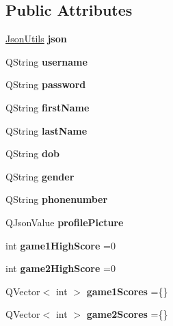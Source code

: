 \subsection*{Public Attributes}
\begin{DoxyCompactItemize}
\item 
\mbox{\label{classUser_af691f29bfbfaecdb752ccdf762f5d037}} 
\hyperlink{classJsonUtils}{Json\+Utils} {\bfseries json}
\item 
\mbox{\label{classUser_ae4202de2b7974e92a55b913d20b03833}} 
Q\+String {\bfseries username}
\item 
\mbox{\label{classUser_ac887622f22a898c097d156ad964be846}} 
Q\+String {\bfseries password}
\item 
\mbox{\label{classUser_aed78465b35175ff33ab3ca3ca1ebe450}} 
Q\+String {\bfseries first\+Name}
\item 
\mbox{\label{classUser_a3a225093bbb405dab285e74e24cef7c5}} 
Q\+String {\bfseries last\+Name}
\item 
\mbox{\label{classUser_a7674a8234cb3ac9ad27866181c34f3a3}} 
Q\+String {\bfseries dob}
\item 
\mbox{\label{classUser_ae7cf3e04e6aba46f20af4c6802630074}} 
Q\+String {\bfseries gender}
\item 
\mbox{\label{classUser_a015d9cec85964df084486386bc6bd9d4}} 
Q\+String {\bfseries phonenumber}
\item 
\mbox{\label{classUser_a5723ab5a77c21e173453505b9af4597f}} 
Q\+Json\+Value {\bfseries profile\+Picture}
\item 
\mbox{\label{classUser_a7f4dadaaea03ff00240d7bd3d2e8a8fd}} 
int {\bfseries game1\+High\+Score} =0
\item 
\mbox{\label{classUser_a4ad78a4dd8e01f69618b510cf5d32cea}} 
int {\bfseries game2\+High\+Score} =0
\item 
\mbox{\label{classUser_a521511071f8d3d804f089a0c6788780a}} 
Q\+Vector$<$ int $>$ {\bfseries game1\+Scores} =\{\}
\item 
\mbox{\label{classUser_a23644b80da955e4ca44a0f74b0b4b11e}} 
Q\+Vector$<$ int $>$ {\bfseries game2\+Scores} =\{\}
\end{DoxyCompactItemize}


